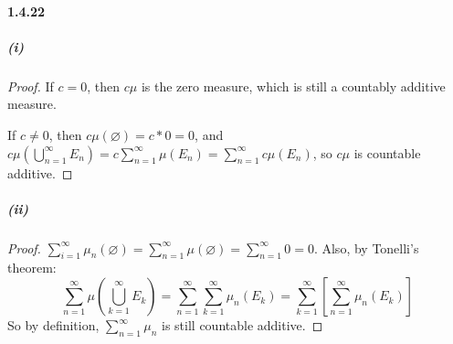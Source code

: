 \documentclass{article}
\begin{document}
\paragraph{1.4.22}
\subparagraph{(i)}
\begin{proof}
If $c=0$, then $c\mu$ is the zero measure, which is still a countably additive measure.

If $c\neq 0$, then $c\mu(\varnothing)=c*0=0$, and $c\mu(\bigcup_{n=1}^{\infty}E_n)=c\sum_{n=1}^{\infty}\mu(E_n)=\sum_{n=1}^{\infty}c\mu(E_n)$, so $c\mu$ is countable additive.
\end{proof}
\subparagraph{(ii)}
\begin{proof}
$\sum_{i=1}^{\infty}\mu_n(\varnothing)=\sum_{n=1}^{\infty}\mu(\varnothing)=\sum_{n=1}^{\infty}0=0$. Also, by Tonelli's theorem:
\[\sum_{n=1}^{\infty}\mu(\bigcup_{k=1}^{\infty}E_k)=\sum_{n=1}^{\infty}\sum_{k=1}^{\infty}\mu_n(E_k)=\sum_{k=1}^{\infty}\left[\sum_{n=1}^{\infty}\mu_n(E_k)\right]\]
So by definition, $\sum_{n=1}^{\infty}\mu_n$ is still countable additive.
\end{proof}
\end{document}
